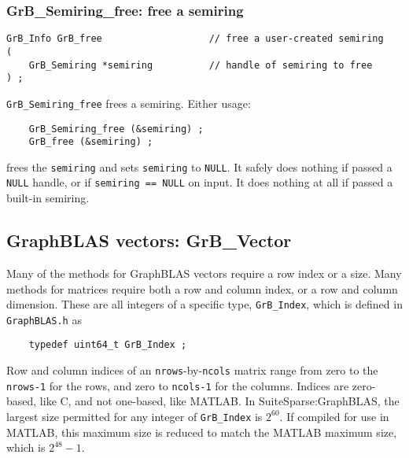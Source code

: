 \documentclass[12pt]{article}
\begin{document}
\subsubsection{{\sf GrB\_Semiring\_free:} free a semiring}
\label{semiring_free}

\begin{mdframed}[userdefinedwidth=6in]
{\footnotesize
\begin{verbatim}
GrB_Info GrB_free                   // free a user-created semiring
(
    GrB_Semiring *semiring          // handle of semiring to free
) ;
\end{verbatim}
} \end{mdframed}

\verb'GrB_Semiring_free' frees a semiring.  Either usage:

    {\small
    \begin{verbatim}
    GrB_Semiring_free (&semiring) ;
    GrB_free (&semiring) ; \end{verbatim}}

\noindent
frees the \verb'semiring' and sets \verb'semiring' to \verb'NULL'.  It safely
does nothing if passed a \verb'NULL' handle, or if \verb'semiring == NULL' on
input.  It does nothing at all if passed a built-in semiring.

\newpage
\subsection{GraphBLAS vectors: {\sf GrB\_Vector}} %
\label{vector}

Many of the methods for GraphBLAS vectors require a row index or a size.  Many
methods for matrices require both a row and column index, or a row and column
dimension.  These are all integers of a specific type, \verb'GrB_Index',
which is defined in \verb'GraphBLAS.h' as

    {\footnotesize
    \begin{verbatim}
    typedef uint64_t GrB_Index ; \end{verbatim}}

Row and column indices of an \verb'nrows'-by-\verb'ncols' matrix range from
zero to the \verb'nrows-1' for the rows, and zero to \verb'ncols-1' for the
columns.  Indices are zero-based, like C, and not one-based, like MATLAB.
In SuiteSparse:GraphBLAS, the largest size permitted for any integer of
\verb'GrB_Index' is $2^{60}$.  If compiled for use in MATLAB, this maximum
size is reduced to match the MATLAB maximum size, which is $2^{48}-1$.
\end{document}
